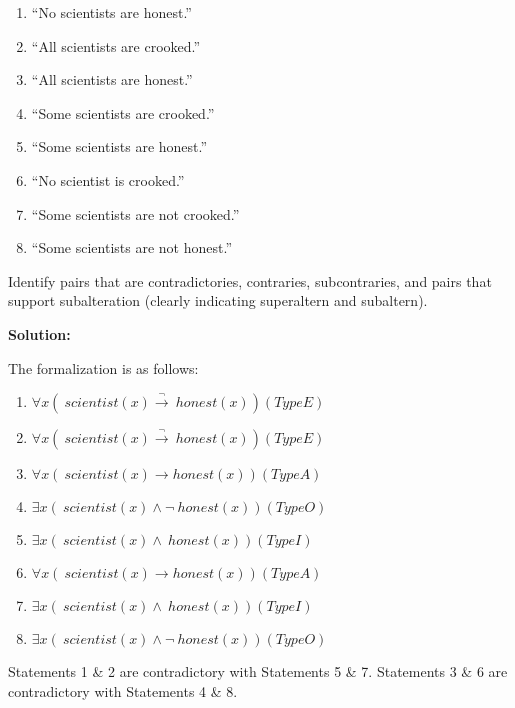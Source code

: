 \documentclass[12pt]{article}
\begin{document}
\begin{enumerate}
\item ``No scientists are honest.''

\item ``All scientists are crooked.''

\item ``All scientists are honest.''

\item ``Some scientists are crooked.''

\item ``Some scientists are honest.''

\item ``No scientist is crooked.''

\item ``Some scientists are not crooked.''

\item ``Some scientists are not honest.''

\end{enumerate}

\noindent Identify pairs that are contradictories, contraries, subcontraries, and pairs that support subalteration (clearly indicating superaltern and subaltern).

\bigskip
\noindent \textbf{Solution:}

\noindent The formalization is as follows:

\begin{enumerate}
\item $\forall x (~scientist(x) \xrightarrow \neg ~honest(x)) (Type E)$
\item $\forall x (~scientist(x) \xrightarrow \neg ~honest(x)) (Type E)$
\item $\forall x (~scientist(x) \xrightarrow ~honest(x)) (Type A)$
\item $\exists x (~scientist(x) \wedge \neg ~honest(x)) (Type O)$
\item $\exists x (~scientist(x) \wedge ~honest(x)) (Type I)$
\item $\forall x (~scientist(x) \xrightarrow ~honest(x)) (Type A)$
\item $\exists x (~scientist(x) \wedge ~honest(x)) (Type I)$
\item $\exists x (~scientist(x) \wedge \neg ~honest(x)) (Type O)$
\end{enumerate}

\noindent Statements 1 \& 2 are contradictory with Statements 5 \& 7. Statements 3 \& 6 are contradictory with Statements 4 \& 8. 
\end{document}

